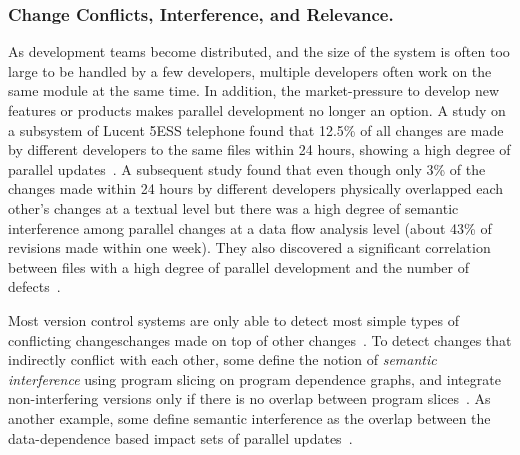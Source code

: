 \subsubsection{Change Conflicts, Interference, and Relevance. } 
\label{sec:conflict} 
As development teams become distributed, and the size of the system is often too large to be handled by a few developers, multiple developers often work on the same module at the same time. In addition, the market-pressure to develop new features or products makes parallel development no longer an option.  A study on a subsystem of Lucent 5ESS telephone found that 12.5\% of all changes are made by different developers to the same files within 24 hours, showing a high degree of parallel updates~\cite{Perry2001:parallel}. A subsequent study found that even though only 3\% of the changes made within 24 hours by different developers physically overlapped each other's changes at a textual level but there was a high degree of semantic interference among parallel changes at a data flow analysis level (about 43\% of revisions made within one week). They also discovered a significant correlation between files with a high degree of parallel development and the number of defects~\cite{Shao2007:interference}. 

Most version control systems are only able to detect most simple types of conflicting changes\textemdash changes made on top of other changes~\cite{mens:survey02}. To detect changes that indirectly conflict with each other, some define the notion of {\em semantic interference} using program slicing on program dependence graphs, and integrate non-interfering versions only if there is no overlap between program slices~\cite{Horwitz1989}. As another example, some define semantic interference as the overlap between the data-dependence based impact sets of parallel updates~\cite{Shao2007:interference}. 


